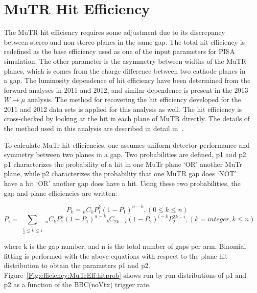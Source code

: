 \section{MuTR Hit Efficiency}
The MuTR hit efficiency requires some adjustment due to its discrepancy between
stereo and non-stereo planes in the same gap. The total hit efficiency is
redefined as the base efficiency used as one of the input parameters for PISA
simulation. The other parameter is the asymmetry between widths of the MuTR
planes, which is comes from the charge difference between two cathode planes in
a gap.  The luminosity dependence of hit efficiency have been determined from
the forward analyses in 2011 and 2012, and similar dependence is present in the
2013 $W\rightarrow\mu$ analysis. The method for recovering the hit efficiency
developed for the 2011 and 2012 data sets is applied for this analysis as well.
The hit efficiency is cross-checked by looking at the hit in each plane of MuTR
directly. The details of the method used in this analysis are described in
detail in~\cite{Seidl2012}.

To calculate MuTr hit efficiencies, one assumes uniform detector performance and
symmetry between two planes in a gap. Two probabilities are defined, p1 and p2.
p1 characterizes the probability of a hit in one MuTr plane `OR' another MuTr
plane, while p2 characterizes the probability that one MuTR gap does `NOT' have
a hit `OR' another gap does have a hit. Using these two probabilities, the gap
and plane efficiencies are written:

\begin{equation}
P_{k}={_n}C_{k}P_{1}^{k}(1-P_{1})^{n-k}, (0\leq k\leq n)
\end{equation}
\begin{equation}
P_{i}=\sum_{\substack{\frac{i}{2}\leq k\leq i}}{_n}C_{k}P_{1}^{k}(1-P_{1})^{n-k}{_k}C_{2k-i}(1-P_{2})^{i-k}P_{2}^{2k-i}, (k=integer, k\leq n)
\end{equation}

{\noindent}where k is the gap number, and n is the total number of gaps per arm.
Binomial fitting is performed with the above equations with respect to the plane
hit distribution to obtain the parameters p1 and p2.
Figure~\ref{Fig:efficiency:MuTrEff:hitprob} shows run by run distributions of p1
and p2 as a function of the BBC(noVtx) trigger rate.

